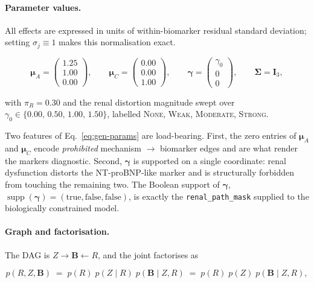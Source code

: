 \paragraph{Parameter values.}
All effects are expressed in units of within-biomarker residual standard
deviation; setting $\sigma_j \equiv 1$ makes this normalisation exact.

\begin{equation}
  \bm{\mu}_A =
  \begin{pmatrix} 1.25 \\ 1.00 \\ 0.00 \end{pmatrix}\!,
  \qquad
  \bm{\mu}_C =
  \begin{pmatrix} 0.00 \\ 0.00 \\ 1.00 \end{pmatrix}\!,
  \qquad
  \bm{\gamma} =
  \begin{pmatrix} \gamma_0 \\ 0 \\ 0 \end{pmatrix}\!,
  \qquad
  \bm{\Sigma} = \bm{I}_3,
  \label{eq:gen-params}
\end{equation}

with $\pi_R = 0.30$ and the renal distortion magnitude swept over
$\gamma_0 \in \{0.00,\, 0.50,\, 1.00,\, 1.50\}$, labelled
\textsc{None}, \textsc{Weak}, \textsc{Moderate}, \textsc{Strong}.

Two features of Eq.~\eqref{eq:gen-params} are load-bearing. First, the zero
entries of $\bm{\mu}_A$ and $\bm{\mu}_C$ encode \emph{prohibited} mechanism
$\to$ biomarker edges and are what render the markers diagnostic. Second,
$\bm{\gamma}$ is supported on a single coordinate: renal dysfunction distorts
the NT-proBNP-like marker and is structurally forbidden from touching the
remaining two. The Boolean support of $\bm{\gamma}$,
$\operatorname{supp}(\bm{\gamma}) = (\text{true}, \text{false}, \text{false})$,
is exactly the \texttt{renal\_path\_mask} supplied to the biologically
constrained model.

\paragraph{Graph and factorisation.}
The DAG is $Z \rightarrow \bm{B} \leftarrow R$, and the joint factorises as

\begin{equation}
  p(R, Z, \bm{B}) \;=\; p(R)\; p(Z \mid R)\; p(\bm{B} \mid Z, R)
                 \;=\; p(R)\; p(Z)\; p(\bm{B} \mid Z, R),
  \label{eq:gen-factorisation}
\end{equation}

